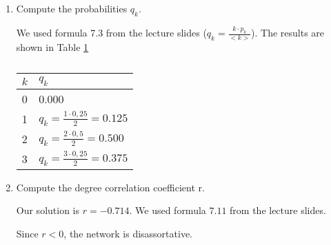 \begin{enumerate}
	$
	E = \frac{1}{8} \cdot \begin{blockarray}{cccc}
		k=1 & k=2 & k=3 \\
		\begin{block}{(ccc)c}
			0 & 0 & 1 & k=1 \\
			0 & 2 & 2 & k=2 \\
			1 & 2 & 0 & k=3 \\
		\end{block}
	\end{blockarray}$
	
	\item Compute the probabilities $q_k$.
	
	We used formula 7.3 from the lecture slides ($q_k = \frac{k \cdot p_k}{<k>}$).  The results are shown in Table \ref{tab:qk}
	
	\begin{table}[h]
	\centering
	\begin{tabular}{|l|l|}
		\hline
		\textbf{$k$} & \textbf{$q_k$} \\ \hline
		0          & 0.000         \\ \hline
		1          & $q_k = \frac{1 \cdot 0,25}{2} = 0.125$ \\ \hline
		2          & $q_k = \frac{2 \cdot 0,5}{2} = 0.500$  \\ \hline
		3          & $q_k = \frac{3 \cdot 0,25}{2} = 0.375$  \\ \hline
	\end{tabular}
	\caption{}
	\label{tab:qk}
	\end{table}

  \item Compute the degree correlation coefficient r.
  
  Our solution is $r = -0.714$. We used formula $7.11$ from the lecture slides. 
  
  Since $r < 0$, the network is disassortative.
\end{enumerate}